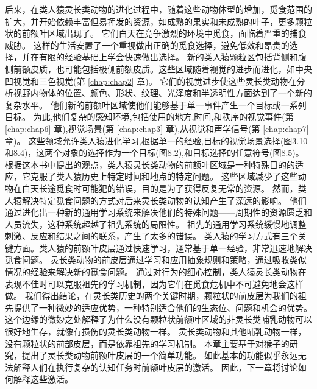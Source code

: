 后来，在类人猿灵长类动物的进化过程中，随着这些动物体型的增加，觅食范围的扩大，并开始依赖丰富但易挥发的资源，如成熟的果实和未成熟的叶子，更多颗粒状的前额叶区域出现了。
它们白天在竞争激烈的环境中觅食，面临着严重的捕食威胁。
这样的生活安置了一个重视做出正确的觅食选择，避免低效和昂贵的选择，并在有限的经验基础上学会快速做出选择。
新的类人猿颗粒区包括背侧和腹侧前额皮质，也可能包括极侧前额皮质。这些区域随着视觉的进步而进化，如中央凹视觉和三色视觉(第 \ref{chap:chap2} 章)。
它们的视觉进步使这些灵长类动物在分析视野内物体的位置、颜色、形状、纹理、光泽度和半透明性方面达到了一个新的复杂水平。
他们新的前额叶区域使他们能够基于单一事件产生一个目标或一系列目标。
为此,他们复杂的感知环境,包括使用的地方,时间,和秩序的视觉事件(第 \ref{chap:chap6} 章),视觉场景(第 \ref{chap:chap3} 章),从视觉和声学信号(第 \ref{chap:chap7} 章)。
这些领域允许类人猿进化学习,根据单一的经验,目标的视觉场景选择(图3.10和8.4)，这两个对象的选择作为一个目标(图8.2),和目标选择的任意符号(图8.5)。
根据这本书中提出的观点，类人猿灵长类动物的前额叶区域是一种特殊目的的适应，它克服了类人猿历史上特定时间和地点的特定问题。
这些区域减少了这些动物在白天长途觅食时可能犯的错误，目的是为了获得反复无常的资源。
然而，类人猿解决特定觅食问题的方式对后来灵长类动物的认知产生了深远的影响。
他们通过进化出一种新的通用学习系统来解决他们的特殊问题——周期性的资源匮乏和人员流失，这种系统超越了祖先系统的局限性。
祖先的通用学习系统缓慢地调整刺激、反应和结果之间的联系，产生了太多的错误。
类人猿的学习方式有三个关键方面。类人猿的前额叶皮层通过快速学习，通常基于单一经验，非常迅速地解决觅食问题。
灵长类动物的前皮层通过学习和应用抽象规则和策略，通过吸收类似情况的经验来解决新的觅食问题。
通过对行为的细心控制，类人猿灵长类动物在表现不佳时可以克服祖先的学习机制，因为它们在觅食危机中不可避免地会这样做。
我们得出结论，在灵长类历史的两个关键时期，颗粒状的前皮层为我们的祖先提供了一种微妙的适应优势，一种特别适合他们的生态位、问题和机会的优势。
这个边缘的微妙之处解释了为什么没有颗粒状前额叶区域的非灵长类哺乳动物可以很好地生存，就像有损伤的灵长类动物一样。
灵长类动物和其他哺乳动物一样，没有颗粒状的前部皮层，而是依靠祖先的学习机制。
本章主要基于对猴子的研究，提出了灵长类动物前额叶皮层的一个简单功能。
如此基本的功能似乎永远无法解释人们在执行复杂的认知任务时前额叶皮层的激活。
因此，下一章将讨论如何解释这些激活。









